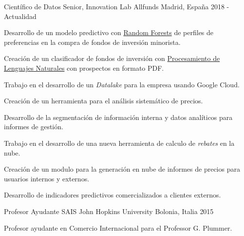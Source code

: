

\begin{cventries}

\cventry
    {Científico de Datos Senior, Innovation Lab} %
    {Allfunds} %
    {Madrid, España} %
    {2018 - Actualidad} %
    {
        \begin{cvitems} %
            \item {Desarrollo de un modelo predictivo con \href{https://es.wikipedia.org/wiki/Random_forest}{Random Forests} de perfiles de preferencias en la compra de fondos de inversión minorista.}
            \item {Creación de un clasificador de fondos de inversión con \href{https://es.wikipedia.org/wiki/Procesamiento_de_lenguajes_naturales}{Procesamiento de Lenguajes Naturales} con prospectos en formato PDF.}
            \item {Trabajo en el desarrollo de un \textit{Datalake} para la empresa usando Google Cloud.}
            \item {Creación de un herramienta para el análisis sistemático de precios.}
            \item {Desarrollo de la segmentación de información interna y datos analíticos para informes de gestión.}
            \item {Trabajo en el desarrollo de una nueva herramienta de calculo de \textit{rebates} en la nube.}
            \item {Creación de un modulo para la generación en nube de informes de precios para usuarios internos y externos.}
            \item {Desarrollo de indicadores predictivos comercializados a clientes externos.}
        \end{cvitems}
    }

\cventry
    {Profesor Ayudante} %
    {SAIS John Hopkins University} %
    {Bolonia, Italia} %
    {2015} %
    {
        \begin{cvitems} %
            \item {Profesor ayudante en Comercio Internacional para el Professor G. Plummer.}
        \end{cvitems}
    }


\end{cventries}
